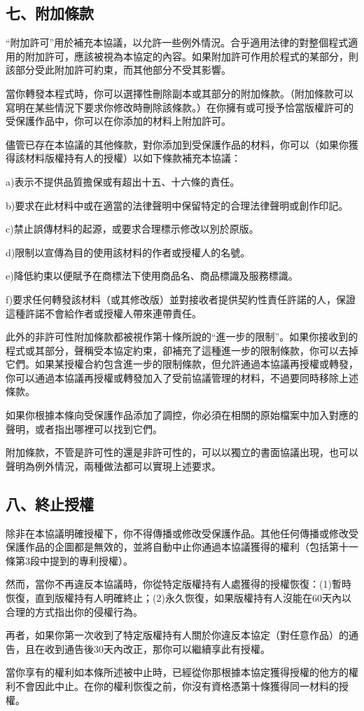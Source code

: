 \subsection{七、附加條款}
“附加許可”用於補充本協議，以允許一些例外情況。合乎適用法律的對整個程式適用的附加許可，應該被視為本協定的內容。如果附加許可作用於程式的某部分，則該部分受此附加許可約束，而其他部分不受其影響。\par
當你轉發本程式時，你可以選擇性刪除副本或其部分的附加條款。（附加條款可以寫明在某些情況下要求你修改時刪除該條款。）在你擁有或可授予恰當版權許可的受保護作品中，你可以在你添加的材料上附加許可。\par
儘管已存在本協議的其他條款，對你添加到受保護作品的材料，你可以（如果你獲得該材料版權持有人的授權）以如下條款補充本協議：\par
a)表示不提供品質擔保或有超出十五、十六條的責任。\par
b)要求在此材料中或在適當的法律聲明中保留特定的合理法律聲明或創作印記。\par
c)禁止誤傳材料的起源，或要求合理標示修改以別於原版。\par
d)限制以宣傳為目的使用該材料的作者或授權人的名號。\par
e)降低約束以便賦予在商標法下使用商品名、商品標識及服務標識。\par
f)要求任何轉發該材料（或其修改版）並對接收者提供契約性責任許諾的人，保證這種許諾不會給作者或授權人帶來連帶責任。\par
此外的非許可性附加條款都被視作第十條所說的“進一步的限制”。如果你接收到的程式或其部分，聲稱受本協定約束，卻補充了這種進一步的限制條款，你可以去掉它們。如果某授權合約包含進一步的限制條款，但允許通過本協議再授權或轉發，你可以通過本協議再授權或轉發加入了受前協議管理的材料，不過要同時移除上述條款。\par
如果你根據本條向受保護作品添加了調控，你必須在相關的原始檔案中加入對應的聲明，或者指出哪裡可以找到它們。\par
附加條款，不管是許可性的還是非許可性的，可以以獨立的書面協議出現，也可以聲明為例外情況，兩種做法都可以實現上述要求。
\subsection{八、終止授權}
除非在本協議明確授權下，你不得傳播或修改受保護作品。其他任何傳播或修改受保護作品的企圖都是無效的，並將自動中止你通過本協議獲得的權利（包括第十一條第3段中提到的專利授權）。\par
然而，當你不再違反本協議時，你從特定版權持有人處獲得的授權恢復：(1)暫時恢復，直到版權持有人明確終止；(2)永久恢復，如果版權持有人沒能在60天內以合理的方式指出你的侵權行為。\par
再者，如果你第一次收到了特定版權持有人關於你違反本協定（對任意作品）的通告，且在收到通告後30天內改正，那你可以繼續享此有授權。\par
當你享有的權利如本條所述被中止時，已經從你那根據本協定獲得授權的他方的權利不會因此中止。在你的權利恢復之前，你沒有資格憑第十條獲得同一材料的授權。
